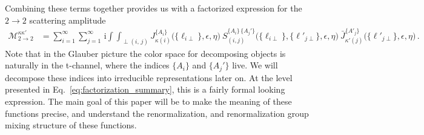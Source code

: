 \documentclass[letterpaper,11pt]{article}
\newcommand{\eq}[1]{Eq.~\eqref{eq:#1}}
\newcommand{\img}{\mathrm{i}}
\newcommand{\cM}{\mathcal{M}}
\newcommand{\IInt}{\int\!\!\!\!\!\int}
\begin{document}
Combining these terms together provides us with a factorized expression for the $2\to2$ scattering amplitude
\begin{align} \label{eq:factorization_summary}
  \cM_{2\to 2}^{\kappa\kappa'}
  & = \sum_{i=1}^\infty \sum_{j=1}^\infty \, \img \! \IInt_{\perp(i,\,j)}  
  J_{\kappa(i)}^{\{A_i\}}\bigl(\{\ell_{i\perp}\},\epsilon,\eta\bigr)\:
  S_{(i,j)}^{\{A_i\}\,\{A_j'\}}\bigl(\{\ell_{i\perp}\},\{\ell'_{j\perp}\},
   \epsilon,\eta\bigr)\:
  \bar J_{\kappa'(j)}^{\{A'_j\}}\bigl(\{\ell'_{j\perp}\},\epsilon,\eta\bigr)
  \,.
\end{align}
Note that in the Glauber picture the color space for decomposing objects is naturally in the t-channel, where the indices $\{A_i\}$ and $\{A_j'\}$ live. We will decompose these indices into irreducible representations later on.
At the level presented in \eq{factorization_summary}, this is a fairly formal looking expression. The main goal of this paper will be to make the meaning of these functions precise, and understand the renormalization, and renormalization group mixing structure of these functions.
\end{document}
